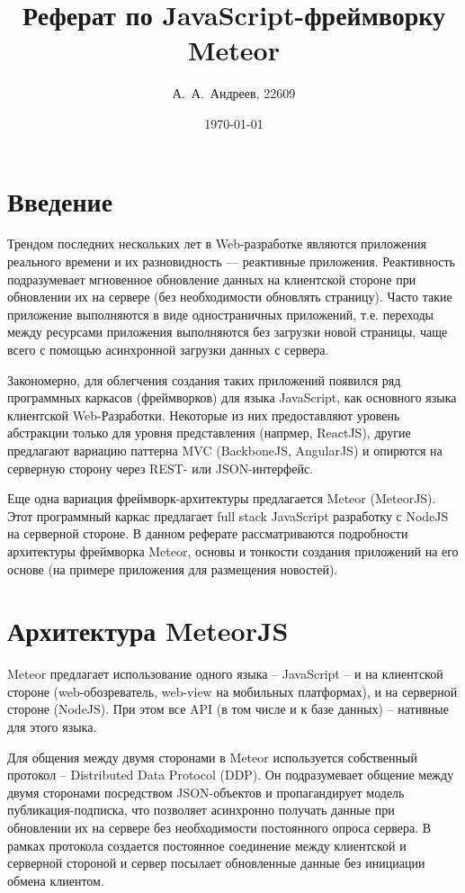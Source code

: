 \documentclass[a4paper,12pt]{article}
\begin{document}
\title{Реферат по JavaScript-фреймворку Meteor}
\author{А.~А.~Андреев, 22609}
\date{\today}
\maketitle

\large

\section*{Введение}
Трендом последних нескольких лет в Web-разработке являются приложения реального
времени и их разновидность --- реактивные приложения. Реактивность подразумевает
мгновенное обновление данных на клиентской стороне при обновлении их на сервере
(без необходимости обновлять страницу). Часто такие приложение выполняются в виде
одностраничных приложений, т.е. переходы между ресурсами приложения выполняются
без загрузки новой страницы, чаще всего с помощью асинхронной загрузки данных
с сервера. 

Закономерно, для облегчения создания таких приложений появился ряд программных
каркасов (фреймворков) для языка JavaScript, как основного языка клиентской
Web-Разработки. Некоторые из них предоставляют уровень абстракции
только для уровня представления (напрмер, ReactJS), другие предлагают
вариацию паттерна MVC (BackboneJS, AngularJS) и опирются на серверную сторону
через REST- или JSON-интерфейс.

Еще одна вариация фреймворк-архитектуры предлагается Meteor (MeteorJS). 
Этот программный каркас предлагает full stack JavaScript разработку
с NodeJS на серверной стороне. В данном реферате рассматриваются 
подробности архитектуры фреймворка Meteor, основы и тонкости создания
приложений на его основе (на примере приложения для размещения новостей).

\section{Архитектура MeteorJS}
Meteor предлагает использование одного языка -- JavaScript -- и на
клиентской стороне (web-обозреватель, web-view на мобильных платформах), и
на серверной стороне (NodeJS). При этом все API (в том числе и к базе
данных) -- нативные для этого языка.

Для общения между двумя сторонами в Meteor используется собственный протокол --
Distributed Data Protocol (DDP). Он подразумевает общение между двумя сторонами
посредством JSON-объектов и пропагандирует модель публикация-подписка,
что позволяет асинхронно получать данные при обновлении их на сервере
без необходимости постоянного опроса сервера. В рамках протокола создается
постоянное соединение между клиентской и серверной стороной и сервер посылает
обновленные данные без инициации обмена клиентом.
\end{document}
